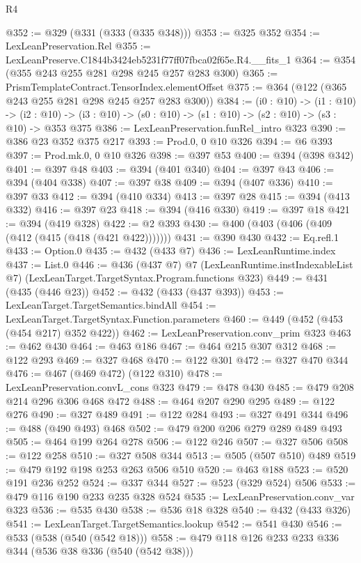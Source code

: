 \begin{lexlean}{R4}
\begin{coremodule}
@352 := @329 (@331 (@333 (@335 @348)))
@353 := @325 @352
@354 := LexLeanPreservation.Rel
@355 := LexLeanPreserve.C1844b3424eb5231f77ff07fbca02f65e.R4.__fits_1
@364 := @354 (@355 @243 @255 @281 @298 @245 @257 @283 @300)
@365 := PrismTemplateContract.TensorIndex.elementOffset
@375 := @364 (@122 (@365 @243 @255 @281 @298 @245 @257 @283 @300))
@384 := (i0 : @10) ->
  (i1 : @10) ->
  (i2 : @10) -> (i3 : @10) -> (s0 : @10) -> (s1 : @10) -> (s2 : @10) -> (s3 : @10) -> @353 @375
@386 := LexLeanPreservation.funRel_intro @323
@390 := @386 @23 @352 @375 @217
@393 := Prod.{0, 0} @10 @326
@394 := @6 @393
@397 := Prod.mk.{0, 0} @10 @326
@398 := @397 @53
@400 := @394 (@398 @342)
@401 := @397 @48
@403 := @394 (@401 @340)
@404 := @397 @43
@406 := @394 (@404 @338)
@407 := @397 @38
@409 := @394 (@407 @336)
@410 := @397 @33
@412 := @394 (@410 @334)
@413 := @397 @28
@415 := @394 (@413 @332)
@416 := @397 @23
@418 := @394 (@416 @330)
@419 := @397 @18
@421 := @394 (@419 @328)
@422 := @2 @393
@430 := @400 (@403 (@406 (@409 (@412 (@415 (@418 (@421 @422)))))))
@431 := @390 @430
@432 := Eq.refl.{1}
@433 := Option.{0}
@435 := @432 (@433 @7)
@436 := LexLeanRuntime.index
@437 := List.{0}
@446 := @436
    (@437 @7)
    @7
    (LexLeanRuntime.instIndexableList @7)
    (LexLeanTarget.TargetSyntax.Program.functions @323)
@449 := @431 (@435 (@446 @23))
@452 := @432 (@433 (@437 @393))
@453 := LexLeanTarget.TargetSemantics.bindAll
@454 := LexLeanTarget.TargetSyntax.Function.parameters
@460 := @449 (@452 (@453 (@454 @217) @352 @422))
@462 := LexLeanPreservation.conv_prim @323
@463 := @462 @430
@464 := @463 @186
@467 := @464 @215 @307 @312
@468 := @122 @293
@469 := @327 @468
@470 := @122 @301
@472 := @327 @470 @344
@476 := @467 (@469 @472) (@122 @310)
@478 := LexLeanPreservation.convL_cons @323
@479 := @478 @430
@485 := @479 @208 @214 @296 @306 @468 @472
@488 := @464 @207 @290 @295
@489 := @122 @276
@490 := @327 @489
@491 := @122 @284
@493 := @327 @491 @344
@496 := @488 (@490 @493) @468
@502 := @479 @200 @206 @279 @289 @489 @493
@505 := @464 @199 @264 @278
@506 := @122 @246
@507 := @327 @506
@508 := @122 @258
@510 := @327 @508 @344
@513 := @505 (@507 @510) @489
@519 := @479 @192 @198 @253 @263 @506 @510
@520 := @463 @188
@523 := @520 @191 @236 @252
@524 := @337 @344
@527 := @523 (@329 @524) @506
@533 := @479 @116 @190 @233 @235 @328 @524
@535 := LexLeanPreservation.conv_var @323
@536 := @535 @430
@538 := @536 @18 @328
@540 := @432 (@433 @326)
@541 := LexLeanTarget.TargetSemantics.lookup
@542 := @541 @430
@546 := @533 (@538 (@540 (@542 @18)))
@558 := @479 @118 @126 @233 @233 @336 @344 (@536 @38 @336 (@540 (@542 @38)))

\end{coremodule}
\end{lexlean}
